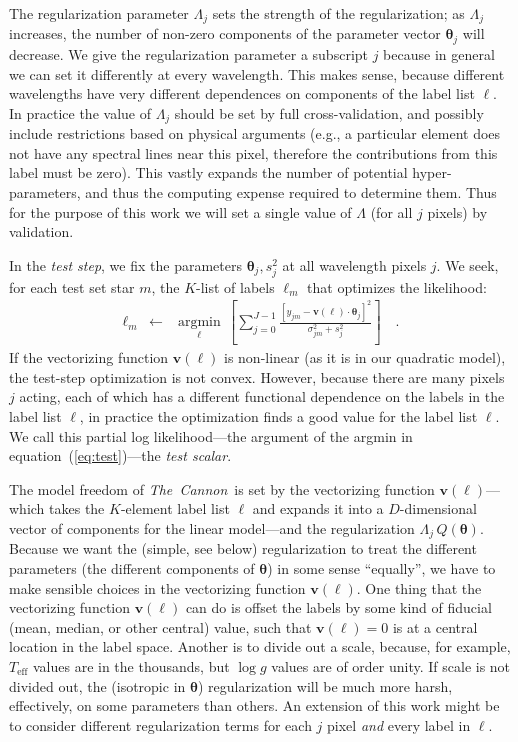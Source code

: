 \documentclass[12pt,preprint]{aastex6}
\newcommand{\project}[1]{\textsl{#1}}
\newcommand{\TheCannon}{\project{The~Cannon}}
\newcommand{\logg}{\log g}
\newcommand{\Teff}{T_{\mathrm{eff}}}
\newcommand{\Dvector}[1]{\boldsymbol{#1}}
\newcommand{\vectheta}{\Dvector{\theta}}
\newcommand{\vecv}{\Dvector{v}}
\newcommand{\argmin}[1]{\underset{#1}{\operatorname{argmin}}\,}
\begin{document}
The regularization parameter $\Lambda_j$ sets the strength of the 
regularization; as $\Lambda_j$ increases, the number of non-zero components of 
the parameter vector $\vectheta_j$ will decrease.  We give the regularization 
parameter a subscript $j$ because in general we can set it differently at every
wavelength.  This makes sense, because different wavelengths have very different
dependences on components of the label list $\ell$.  In practice the
value of $\Lambda_j$ should be set by full cross-validation, and possibly 
include restrictions based on physical arguments (e.g., a particular element 
does not have any spectral lines near this pixel, therefore the contributions
from this label must be zero).  This vastly expands the number of potential 
hyper-parameters, and thus the computing expense required to determine them.  
Thus for the purpose of this work we will set a single value of $\Lambda$ (for 
all $j$ pixels) by validation.


In the \emph{test step}, we fix the parameters $\vectheta_j,s^2_j$ at all
wavelength pixels $j$.  We seek, for each test set star $m$, the $K$-list of 
labels $\ell_m$ that optimizes the likelihood:
\begin{eqnarray}\label{eq:test}
  \ell_m &\leftarrow& \argmin{\ell}\left[
    \sum_{j=0}^{J-1} \frac{[y_{jm}-\vecv(\ell)\cdot\vectheta_j]^2}{\sigma^2_{jm}+s^2_j}
    \right]
  \quad .
\end{eqnarray}
If the vectorizing function $\vecv(\ell)$ is non-linear (as it is in our 
quadratic model), the test-step optimization is not convex.  However, because
there are many pixels $j$ acting, each of which has a different functional
dependence on the labels in the label list $\ell$, in practice the optimization 
finds a good value for the label list $\ell$.  We call
this partial log likelihood---the argument of the argmin in 
equation~(\ref{eq:test})---the \emph{test scalar}.


The model freedom of \TheCannon\ is set by the vectorizing function 
$\vecv(\ell)$---which takes the $K$-element label list $\ell$ and expands it 
into a $D$-dimensional vector of components for the linear model---and the 
regularization $\Lambda_j\,Q(\vectheta)$.  Because we want the (simple, see 
below) regularization to treat the different parameters (the different 
components of $\vectheta$) in some sense ``equally'', we have to make sensible 
choices in the vectorizing function $\vecv(\ell)$.  One thing that the 
vectorizing function $\vecv(\ell)$ can do is offset the labels by some kind of
fiducial (mean, median, or other central) value, such that $\vecv(\ell)=0$ is at
a central location in the label space.  Another is to divide out a scale, 
because, for example, $\Teff$ values are in the thousands, but $\logg$ values
are of order unity.  If scale is not divided out, the (isotropic in $\vectheta$)
regularization will be much more harsh, effectively, on some parameters than 
others.  An extension of this work might be to consider different regularization
terms for each $j$ pixel \emph{and} every label in $\ell$.
\end{document}
